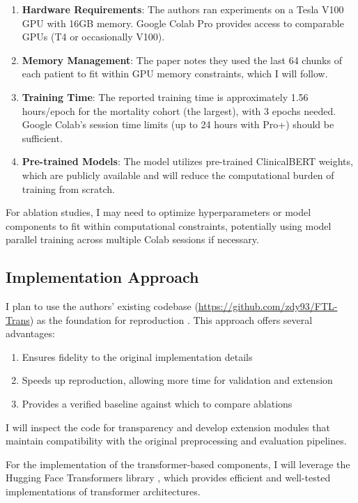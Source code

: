 \documentclass[10pt,letterpaper,twocolumn]{article}
\begin{document}
\begin{enumerate}[leftmargin=*]
    \item \textbf{Hardware Requirements}: The authors ran experiments on a Tesla V100 GPU with 16GB memory. Google Colab Pro provides access to comparable GPUs (T4 or occasionally V100).
    
    \item \textbf{Memory Management}: The paper notes they used the last 64 chunks of each patient to fit within GPU memory constraints, which I will follow.
    
    \item \textbf{Training Time}: The reported training time is approximately 1.56 hours/epoch for the mortality cohort (the largest), with 3 epochs needed. Google Colab's session time limits (up to 24 hours with Pro+) should be sufficient.
    
    \item \textbf{Pre-trained Models}: The model utilizes pre-trained ClinicalBERT \cite{huang2019clinicalbert} weights, which are publicly available and will reduce the computational burden of training from scratch.
\end{enumerate}

For ablation studies, I may need to optimize hyperparameters or model components to fit within computational constraints, potentially using model parallel training across multiple Colab sessions if necessary.

\subsection{Implementation Approach}

I plan to use the authors' existing codebase (\url{https://github.com/zdy93/FTL-Trans}) as the foundation for reproduction \cite{zhang2020time}. This approach offers several advantages:

\begin{enumerate}[leftmargin=*]
    \item Ensures fidelity to the original implementation details
    \item Speeds up reproduction, allowing more time for validation and extension
    \item Provides a verified baseline against which to compare ablations
\end{enumerate}

I will inspect the code for transparency and develop extension modules that maintain compatibility with the original preprocessing and evaluation pipelines.

For the implementation of the transformer-based components, I will leverage the Hugging Face Transformers library \cite{wolf2019huggingface}, which provides efficient and well-tested implementations of transformer architectures.



\end{document}
